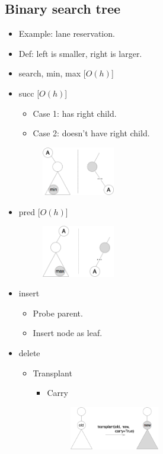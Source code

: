 \documentclass[twocolumn]{article}
\begin{document}
\subsection{Binary search tree}
\begin{itemize}
\item Example: lane reservation.
\item Def: left is smaller, right is larger.
  \item search, min, max [$O(h)$]
  \item succ [$O(h)$]
    \begin{itemize}
    \item Case 1: has right child.
    \item Case 2: doesn't have right child.
    \end{itemize}
    \begin{figure}[H]
    \centering
    \includegraphics[width=0.3\textwidth]{assets/bst-succ}
    \end{figure}
  \item pred [$O(h)$]
    \begin{figure}[H]
    \centering
    \includegraphics[width=0.3\textwidth]{assets/bst-pred}
    \end{figure}
  \item insert
    \begin{itemize}
    \item Probe parent.
    \item Insert node as leaf.
    \end{itemize}
  \item delete
    \begin{itemize}
    \item Transplant
      \begin{itemize}
      \item Carry
        \begin{figure}[H]
        \centering
        \includegraphics[width=0.42\textwidth]{assets/bst-transplant-carry}

\end{figure}
\end{itemize}
\end{itemize}
\end{itemize}
\end{document}
